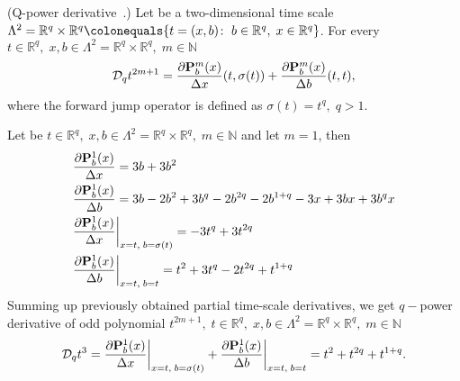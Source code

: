 \begin{cor}
    \label{q_power_derivative_case}
    (Q-power derivative~\cite{aldwoah2011power}.)
    Let be a two-dimensional time scale
    $\Lambda^2 = {\mathbb{R}}^{q} \times {\mathbb{R}}^{q} \colonequals \{t=(x,b) \colon \; b\in {\mathbb{R}}^{q}, \; x\in{\mathbb{R}}^{q} \}$.
    For every $t\in {\mathbb{R}}^{q}, \; x,b\in\Lambda^2 = {\mathbb{R}}^{q} \times {\mathbb{R}}^{q}, \; m\in\mathbb{N}$
    \[
        \mathcal{D}_q t^{2m+1}
        = \frac{\partial {\mathbf{P}}\sp{m} \sb{b}(x)}{\Delta x}(t, \sigma(t))
        + \frac{\partial {\mathbf{P}}\sp{m} \sb{b}(x)}{\Delta b}(t, t),
    \]
    where the forward jump operator is defined as $\sigma(t) = t^q, \; q > 1$.
\end{cor}
\begin{examp}
    \label{time_scale_nq_example_1}
    Let be $t\in {\mathbb{R}}^{q}, \; x,b\in\Lambda^2 = {\mathbb{R}}^{q} \times {\mathbb{R}}^{q}, \; m\in\mathbb{N}$
    and let $m=1$, then
    \begin{align*}
        &\frac{\partial {\mathbf{P}}\sp{1} \sb{b}(x)}{\Delta x} = 3 b + 3 b^2 \\
        &\frac{\partial {\mathbf{P}}\sp{1} \sb{b}(x)}{\Delta b} = 3 b - 2 b^2 + 3 b^q - 2 b^{2 q} - 2 b^{1 + q} - 3 x + 3 b x + 3 b^q x \\
        &\frac{\partial {\mathbf{P}}\sp{1} \sb{b}(x)}{\Delta x} \bigg |_{x = t, \; b = \sigma(t)} = -3 t^q + 3 t^{2 q} \\
        &\frac{\partial {\mathbf{P}}\sp{1} \sb{b}(x)}{\Delta b} \bigg |_{x = t, \; b = t} = t^2 + 3 t^q - 2 t^{2 q} + t^{1 + q}
    \end{align*}
    Summing up previously obtained partial time-scale derivatives, we get $q-$power derivative of odd polynomial
    $t^{2m+1}, \; t\in {\mathbb{R}}^{q}, \; x,b\in\Lambda^2 = {\mathbb{R}}^{q} \times {\mathbb{R}}^{q}, \; m\in\mathbb{N}$
    \[
        \mathcal{D}_q t^{3}
        = \frac{\partial {\mathbf{P}}\sp{1} \sb{b}(x)}{\Delta x} \bigg |_{x = t, \; b = \sigma(t)}
        + \frac{\partial {\mathbf{P}}\sp{1} \sb{b}(x)}{\Delta b} \bigg |_{x = t, \; b = t}
        = t^2 + t^{2 q} + t^{1 + q}.
    \]
\end{examp}
